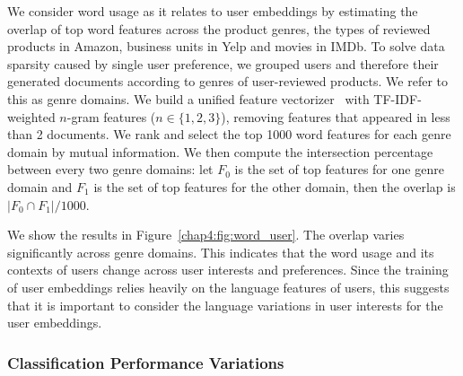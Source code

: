 We consider word usage as it relates to user embeddings by estimating the overlap of top word features across the product genres, the types of reviewed products in Amazon, business units in Yelp and movies in IMDb.
To solve data sparsity caused by single user preference, we grouped users and therefore their generated documents according to genres of user-reviewed products.
We refer to this as genre domains.
We build a unified feature vectorizer~\cite{pedregosa2011scikit} with TF-IDF-weighted $n$-gram features ($n \in \{1,2,3\}$), removing features that appeared in less than 2 documents.
We rank and select the top 1000 word features for each genre domain by mutual information.
We then compute the intersection percentage between every two genre domains: let $F_0$ is the set of top features for one genre domain and $F_1$ is the set of top features for the other domain, then the overlap is $|F_0 \cap F_1|/1000$.

We show the results in Figure~\ref{chap4:fig:word_user}.
The overlap varies significantly across genre domains. 
This indicates that the word usage and its contexts of users change across user interests and preferences. 
Since the training of user embeddings relies heavily on the language features of users, this suggests that it is important to consider the language variations in user interests for the user embeddings.


\subsubsection{Classification Performance Variations}

